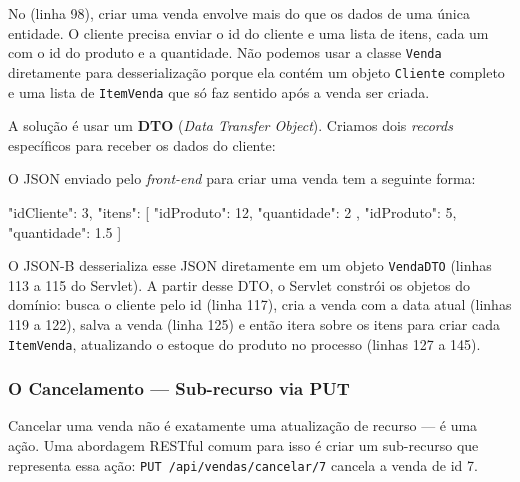 No  (linha 98), criar uma venda envolve mais do que os dados de uma única entidade. O cliente precisa enviar o id do cliente e uma lista de itens, cada um com o id do produto e a quantidade. Não podemos usar a classe \texttt{Venda} diretamente para desserialização porque ela contém um objeto \texttt{Cliente} completo e uma lista de \texttt{ItemVenda} que só faz sentido após a venda ser criada.

A solução é usar um \textbf{DTO} (\textit{Data Transfer Object}). Criamos dois \textit{records} específicos para receber os dados do cliente:



O JSON enviado pelo \textit{front-end} para criar uma venda tem a seguinte forma:

\begin{boxJsonCode}[title=Exemplo de JSON para criação de venda]
{
    "idCliente": 3,
    "itens": [
        { "idProduto": 12, "quantidade": 2 },
        { "idProduto": 5,  "quantidade": 1.5 }
    ]
}
\end{boxJsonCode}

O JSON-B desserializa esse JSON diretamente em um objeto \texttt{VendaDTO} (linhas 113 a 115 do Servlet). A partir desse DTO, o Servlet constrói os objetos do domínio: busca o cliente pelo id (linha 117), cria a venda com a data atual (linhas 119 a 122), salva a venda (linha 125) e então itera sobre os itens para criar cada \texttt{ItemVenda}, atualizando o estoque do produto no processo (linhas 127 a 145).

\subsubsection{O Cancelamento --- Sub-recurso via PUT}

Cancelar uma venda não é exatamente uma atualização de recurso --- é uma ação. Uma abordagem RESTful comum para isso é criar um sub-recurso que representa essa ação: \texttt{PUT /api/vendas/cancelar/7} cancela a venda de id 7.

